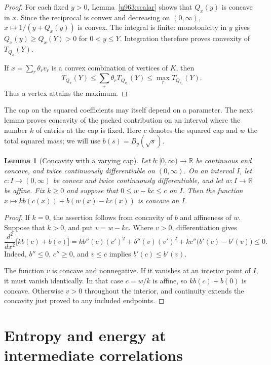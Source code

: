 \documentclass[11pt,letterpaper]{amsart}
\newcommand{\R}{\mathbb R}
\newcommand{\1}{\mathbf 1}
\newtheorem{lemma}[theorem]{Lemma}
\numberwithin{equation}{section}
\begin{document}
\begin{proof}
For each fixed $y>0$, Lemma~\ref{u963:scalar} shows that
$Q_x(y)$ is concave in $x$.
Since the reciprocal is convex and decreasing on $(0,\infty)$,
$x\mapsto1/(y+Q_x(y))$ is convex.
The integral is finite: monotonicity in $y$ gives
$Q_x(y)\ge Q_x(Y)>0$ for $0<y\le Y$.
Integration therefore proves convexity of $T_{Q_x}(Y)$.

If $x=\sum_r\theta_r v_r$ is a convex combination of vertices
of $K$, then
\[
 T_{Q_x}(Y)
 \le\sum_r\theta_r T_{Q_{v_r}}(Y)
 \le\max_r T_{Q_{v_r}}(Y).
\]
Thus a vertex attains the maximum.
\end{proof}

The cap on the squared coefficients may itself depend on a
parameter. The next lemma proves concavity of the packed
contribution on an interval where the number $k$ of entries
at the cap is fixed. Here $c$ denotes the squared cap and
$w$ the total squared mass; we will use $b(s)=B_y(\sqrt s)$.

\begin{lemma}[Concavity with a varying cap]\label{lem:moving-cap}
Let $b:[0,\infty)\to\R$ be continuous and concave, and twice
continuously differentiable on $(0,\infty)$.
On an interval $I$, let $c:I\to(0,\infty)$ be convex and twice
continuously differentiable, and let $w:I\to\R$ be affine.
Fix $k\ge0$ and suppose that $0\le w-kc\le c$ on $I$.
Then the function
$x\mapsto kb(c(x))+b(w(x)-kc(x))$ is concave on $I$.
\end{lemma}

\begin{proof}
If $k=0$, the assertion follows from concavity of $b$ and
affineness of $w$. Suppose that $k>0$, and put $v=w-kc$.
Where $v>0$, differentiation gives
\[
 \frac{d^2}{dx^2}\bigl[kb(c)+b(v)\bigr]
 =kb''(c)(c')^2+b''(v)(v')^2
   +kc''\bigl(b'(c)-b'(v)\bigr)\le0.
\]
Indeed, $b''\le0$, $c''\ge0$, and $v\le c$ implies
$b'(c)\le b'(v)$.

The function $v$ is concave and nonnegative.
If it vanishes at an interior point of $I$, it must vanish
identically. In that case $c=w/k$ is affine, so
$kb(c)+b(0)$ is concave.
Otherwise $v>0$ throughout the interior, and continuity
extends the concavity just proved to any included endpoints.
\end{proof}

\section{Entropy and energy at intermediate correlations}
\label{sec:cover}
\end{document}
